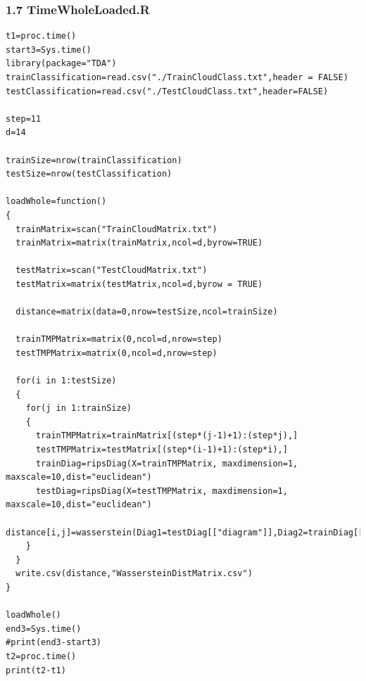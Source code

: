 \documentclass[12pt]{ctexart}
\begin{document}
\subsubsection*{1.7 TimeWholeLoaded.R}
\begin{scriptsize}
\begin{verbatim}
t1=proc.time()
start3=Sys.time()
library(package="TDA")
trainClassification=read.csv("./TrainCloudClass.txt",header = FALSE)
testClassification=read.csv("./TestCloudClass.txt",header=FALSE)

step=11
d=14

trainSize=nrow(trainClassification)
testSize=nrow(testClassification)

loadWhole=function()
{
  trainMatrix=scan("TrainCloudMatrix.txt")
  trainMatrix=matrix(trainMatrix,ncol=d,byrow=TRUE)
  
  testMatrix=scan("TestCloudMatrix.txt")
  testMatrix=matrix(testMatrix,ncol=d,byrow = TRUE)
  
  distance=matrix(data=0,nrow=testSize,ncol=trainSize)
  
  trainTMPMatrix=matrix(0,ncol=d,nrow=step)
  testTMPMatrix=matrix(0,ncol=d,nrow=step)
  
  for(i in 1:testSize)
  {
    for(j in 1:trainSize)
    {
      trainTMPMatrix=trainMatrix[(step*(j-1)+1):(step*j),]
      testTMPMatrix=testMatrix[(step*(i-1)+1):(step*i),]
      trainDiag=ripsDiag(X=trainTMPMatrix, maxdimension=1, maxscale=10,dist="euclidean")
      testDiag=ripsDiag(X=testTMPMatrix, maxdimension=1, maxscale=10,dist="euclidean")
      distance[i,j]=wasserstein(Diag1=testDiag[["diagram"]],Diag2=trainDiag[["diagram"]],dimension=0)
    }
  }
  write.csv(distance,"WassersteinDistMatrix.csv")
}

loadWhole()
end3=Sys.time()
#print(end3-start3)
t2=proc.time()
print(t2-t1)
\end{verbatim}
\end{scriptsize}
\end{document}
